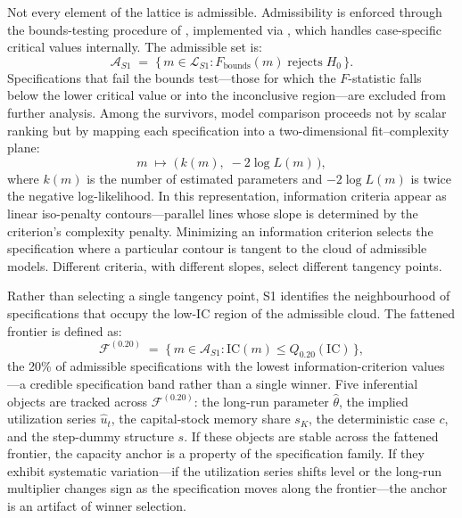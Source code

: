 \documentclass[11pt,a4paper]{article}
\begin{document}

Not every element of the lattice is admissible. Admissibility is enforced
through the bounds-testing procedure of \citet{Pesaran2001}, implemented via
\citet{Natsiopoulos2024}, which handles case-specific critical values
internally. The admissible set is:
%
\begin{equation}
	\label{eq:S1_admissible}
	\mathcal{A}_{S1} \;=\;
	\bigl\{\, m \in \mathcal{L}_{S1} :
	F_{\text{bounds}}(m) \;\text{rejects}\; H_0 \,\bigr\}.
\end{equation}
%
Specifications that fail the bounds test---those for which the $F$-statistic
falls below the lower critical value or into the inconclusive region---are
excluded from further analysis. Among the survivors, model comparison
proceeds not by scalar ranking but by mapping each specification into a
two-dimensional fit--complexity plane:
%
\begin{equation}
	\label{eq:S1_fitcomplexity}
	m \;\mapsto\; \bigl(\,k(m),\; -2\log L(m)\,\bigr),
\end{equation}
%
where $k(m)$ is the number of estimated parameters and $-2\log L(m)$ is twice
the negative log-likelihood. In this representation, information criteria
appear as linear iso-penalty contours---parallel lines whose slope is
determined by the criterion's complexity penalty. Minimizing an information
criterion selects the specification where a particular contour is tangent to
the cloud of admissible models. Different criteria, with different slopes,
select different tangency points.


Rather than selecting a single tangency point, S1 identifies the
neighbourhood of specifications that occupy the low-IC region of the
admissible cloud. The fattened frontier is defined as:
%
\begin{equation}
	\label{eq:S1_frontier}
	\mathcal{F}^{(0.20)} \;=\;
	\bigl\{\, m \in \mathcal{A}_{S1} :
	\mathrm{IC}(m) \leq Q_{0.20}(\mathrm{IC}) \,\bigr\},
\end{equation}
%
the 20\% of admissible specifications with the lowest information-criterion
values---a credible specification band rather than a single winner. Five
inferential objects are tracked across $\mathcal{F}^{(0.20)}$: the long-run
parameter $\hat{\theta}$, the implied utilization series
$\widehat{u}_t$, the capital-stock memory share $s_K$, the deterministic case
$c$, and the step-dummy structure $s$. If these objects are stable across the
fattened frontier, the capacity anchor is a property of the specification
family. If they exhibit systematic variation---if the utilization series
shifts level or the long-run multiplier changes sign as the specification
moves along the frontier---the anchor is an artifact of winner selection.
\end{document}
